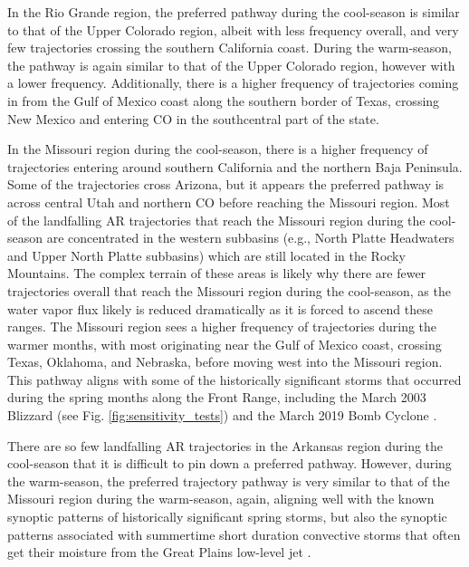 \documentclass[draft]{agujournal2019}
\begin{document}
In the Rio Grande region, the preferred pathway during the cool-season is similar to that of the Upper Colorado region, albeit with less frequency overall, and very few trajectories crossing the southern California coast. During the warm-season, the pathway is again similar to that of the Upper Colorado region, however with a lower frequency. Additionally, there is a higher frequency of trajectories coming in from the Gulf of Mexico coast along the southern border of Texas, crossing New Mexico and entering CO in the southcentral part of the state. 

In the Missouri region during the cool-season, there is a higher frequency of trajectories entering around southern California and the northern Baja Peninsula. Some of the trajectories cross Arizona, but it appears the preferred pathway is across central Utah and northern CO before reaching the Missouri region. Most of the landfalling AR trajectories that reach the Missouri region during the cool-season are concentrated in the western subbasins (e.g., North Platte Headwaters and Upper North Platte subbasins) which are still located in the Rocky Mountains. The complex terrain of these areas is likely why there are fewer trajectories overall that reach the Missouri region during the cool-season, as the water vapor flux likely is reduced dramatically as it is forced to ascend these ranges.  The Missouri region sees a higher frequency of trajectories during the warmer months, with most originating near the Gulf of Mexico coast, crossing Texas, Oklahoma, and Nebraska, before moving west into the Missouri region. This pathway aligns with some of the historically significant storms that occurred during the spring months along the Front Range, including the March 2003 Blizzard (see Fig. \ref{fig:sensitivity_tests}) and the March 2019 Bomb Cyclone \cite{Zou2024A2019}. 

There are so few landfalling AR trajectories in the Arkansas region during the cool-season that it is difficult to pin down a preferred pathway. However, during the warm-season, the preferred trajectory pathway is very similar to that of the Missouri region during the warm-season, again, aligning well with the known synoptic patterns of historically significant spring storms, but also the synoptic patterns associated with summertime short duration convective storms that often get their moisture from the Great Plains low-level jet \cite{Helfand1995ClimatologyStates, Pu2016DynamicalPrecipitation,  Schubert1998SubseasonalStates, Weaver2008VariabilityImpacts}.
\end{document}
